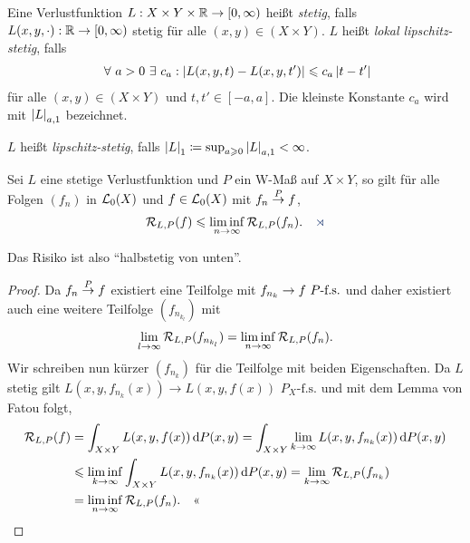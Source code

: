 \begin{defn}
\label{defn:2.1.3}
Eine Verlustfunktion $L: X\times Y\times \mathbb{R}\to[0,\infty)$ heißt
\emph{stetig}, falls 
$L(x,y,\cdot) : \mathbb{R}\to[0,\infty)$
stetig für alle $(x,y)\in (X\times Y)$. $L$ heißt \emph{lokal lipschitz-stetig},
falls
\begin{align*}
\forall a > 0 \exists c_a : \abs{L(x,y,t)-L(x,y,t')} \le c_a\abs{t-t'} 
\end{align*}
für alle $(x,y)\in (X\times Y)$ und $t,t'\in [-a,a]$. Die kleinste Konstante
$c_a$ wird mit $\left|L\right|_{a,1}$ bezeichnet.

$L$ heißt \emph{lipschitz-stetig}, falls $\left|L\right|_1 \coloneq \sup_{a\geqslant 0}
\left|L\right|_{a,1}< \infty$.\fishhere
\end{defn}

\begin{lem}
\label{prop:2.1.4}
Sei $L$ eine stetige Verlustfunktion und $P$ ein W-Maß auf $X\times Y$, so gilt
für alle Folgen $(f_n)$ in $\mathcal{L}_0(X)$ und $f\in \mathcal{L}_0(X)$ mit $f_n\overset{P}{\to} f$,
\begin{align*}
\RR_{L,P}(f) \le \liminf_{n\to\infty} \RR_{L,P}(f_n).\fishhere
\end{align*}
\end{lem}
Das Risiko ist also ``halbstetig von unten''. 

\begin{proof}
Da $f_n\overset{P}{\to} f$ existiert eine Teilfolge mit $f_{n_k} \to f\ P\text{-f.s.}$ und daher
existiert auch eine weitere Teilfolge $(f_{n_{k_l}})$ mit
\begin{align*}
\lim\limits_{l\to\infty} \mathcal{R}_{L,P}(f_{n_{k_l}}) = 
\liminf\limits_{n\to\infty} \mathcal{R}_{L,P}(f_n).
\end{align*}
Wir schreiben nun kürzer $(f_{n_k})$ für die Teilfolge mit beiden Eigenschaften.
Da $L$ stetig gilt $L(x,y,f_{n_k}(x))\to L(x,y,f(x))$ $P_X\text{-f.s.}$ und 
mit dem Lemma von Fatou folgt,
\begin{align*}
\mathcal{R}_{L,P}(f) &= \int_{X\times Y} L(x,y,f(x))\,\mathrm{d} P(x,y)
= \int_{X\times Y} \lim\limits_{k\to\infty }L(x,y,f_{n_k}(x)) \,\mathrm{d} P(x,y)\\
&\leqslant \liminf_{k\to\infty} \int_{X\times Y} L(x,y,f_{n_k}(x)) \,\mathrm{d} P(x,y)
= \lim\limits_{k\to\infty} \mathcal{R}_{L,P}(f_{n_k})\\
&= \liminf_{n\to\infty} \mathcal{R}_{L,P}(f_n).\quad\text{<<}
\end{align*}
\end{proof}

